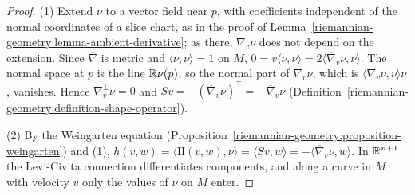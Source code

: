 \begin{proof}
(1) Extend $\nu$ to a vector field near $p$, with coefficients independent of the normal coordinates of a slice chart, as in the proof of Lemma~\ref{riemannian-geometry:lemma-ambient-derivative}; as there, $\overline{\nabla}_v\nu$ does not depend on the extension. Since $\overline{\nabla}$ is metric and $\langle\nu, \nu\rangle = 1$ on $M$,
$0 = v\langle\nu, \nu\rangle = 2\langle\overline{\nabla}_v\nu, \nu\rangle$. The normal space at $p$ is the line $\mathbb{R}\nu(p)$, so the normal part of $\overline{\nabla}_v\nu$, which is $\langle\overline{\nabla}_v\nu, \nu\rangle\nu$, vanishes.
Hence $\nabla^\perp_v\nu = 0$ and $S v = -(\overline{\nabla}_v\nu)^\top = -\overline{\nabla}_v\nu$ (Definition~\ref{riemannian-geometry:definition-shape-operator}).

(2) By the Weingarten equation (Proposition~\ref{riemannian-geometry:proposition-weingarten}) and (1), $h(v, w) = \langle\mathrm{II}(v, w), \nu\rangle = \langle S v, w\rangle = -\langle\overline{\nabla}_v\nu, w\rangle$. In $\mathbb{R}^{n+1}$ the
Levi-Civita connection differentiates components, and along a curve in $M$ with velocity $v$ only the values of $\nu$ on $M$ enter.
\end{proof}

